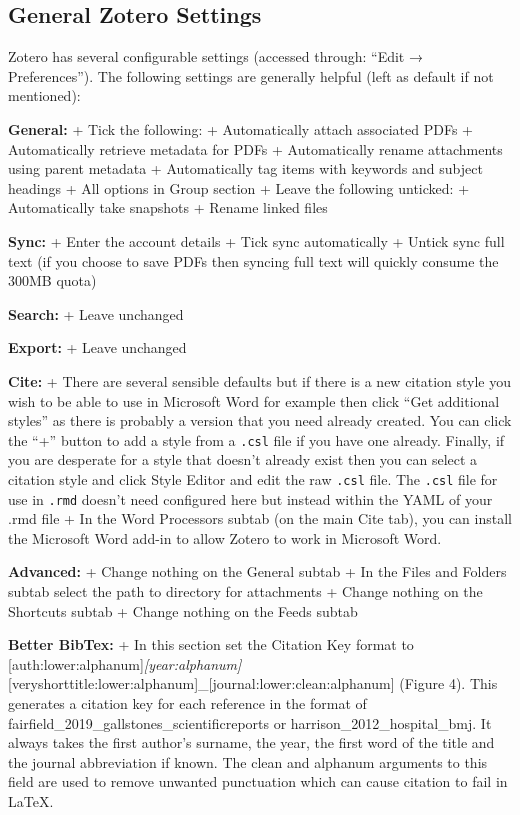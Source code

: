 \documentclass[
]{book}
\begin{document}
\hypertarget{general-zotero-settings}{%
\subsection{General Zotero Settings}\label{general-zotero-settings}}

Zotero has several configurable settings (accessed through: ``Edit → Preferences''). The following settings are generally helpful (left as default if not mentioned):

\textbf{General:}
+ Tick the following:
+ Automatically attach associated PDFs
+ Automatically retrieve metadata for PDFs
+ Automatically rename attachments using parent metadata
+ Automatically tag items with keywords and subject headings
+ All options in Group section
+ Leave the following unticked:
+ Automatically take snapshots
+ Rename linked files

\textbf{Sync:}
+ Enter the account details
+ Tick sync automatically
+ Untick sync full text (if you choose to save PDFs then syncing full text will quickly consume the 300MB quota)

\textbf{Search:}
+ Leave unchanged

\textbf{Export:}
+ Leave unchanged

\textbf{Cite:}
+ There are several sensible defaults but if there is a new citation style you wish to be able to use in Microsoft Word for example then click ``Get additional styles'' as there is probably a version that you need already created. You can click the ``+'' button to add a style from a \texttt{.csl} file if you have one already. Finally, if you are desperate for a style that doesn't already exist then you can select a citation style and click Style Editor and edit the raw \texttt{.csl} file. The \texttt{.csl} file for use in \texttt{.rmd} doesn't need configured here but instead within the YAML of your .rmd file
+ In the Word Processors subtab (on the main Cite tab), you can install the Microsoft Word add-in to allow Zotero to work in Microsoft Word.

\textbf{Advanced:}
+ Change nothing on the General subtab
+ In the Files and Folders subtab select the path to directory for attachments
+ Change nothing on the Shortcuts subtab
+ Change nothing on the Feeds subtab

\textbf{Better BibTex:}
+ In this section set the Citation Key format to {[}auth:lower:alphanum{]}\emph{{[}year:alphanum{]}}{[}veryshorttitle:lower:alphanum{]}\_{[}journal:lower:clean:alphanum{]} (Figure 4). This generates a citation key for each reference in the format of fairfield\_2019\_gallstones\_scientificreports or harrison\_2012\_hospital\_bmj. It always takes the first author's surname, the year, the first word of the title and the journal abbreviation if known. The clean and alphanum arguments to this field are used to remove unwanted punctuation which can cause citation to fail in LaTeX.
\end{document}
